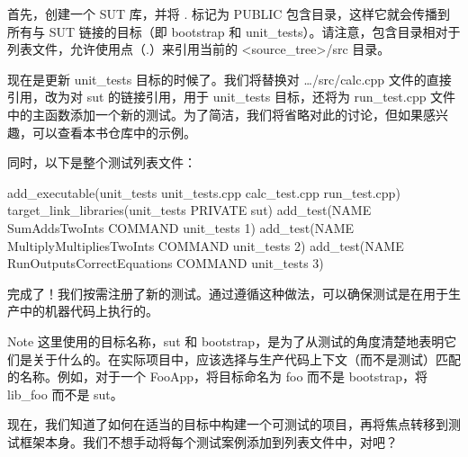 首先，创建一个 SUT 库，并将 . 标记为 PUBLIC 包含目录，这样它就会传播到所有与 SUT 链接的目标（即 bootstrap 和 unit\_tests）。请注意，包含目录相对于列表文件，允许使用点（.）来引用当前的 <source\_tree>/src 目录。

现在是更新 unit\_tests 目标的时候了。我们将替换对 …/src/calc.cpp 文件的直接引用，改为对 sut 的链接引用，用于 unit\_tests 目标，还将为 run\_test.cpp 文件中的主函数添加一个新的测试。为了简洁，我们将省略对此的讨论，但如果感兴趣，可以查看本书仓库中的示例。

同时，以下是整个测试列表文件：


\begin{cmake}
add_executable(unit_tests
               unit_tests.cpp
               calc_test.cpp
               run_test.cpp)
target_link_libraries(unit_tests PRIVATE sut)
add_test(NAME SumAddsTwoInts COMMAND unit_tests 1)
add_test(NAME MultiplyMultipliesTwoInts COMMAND unit_tests 2)
add_test(NAME RunOutputsCorrectEquations COMMAND unit_tests 3)
\end{cmake}

完成了！我们按需注册了新的测试。通过遵循这种做法，可以确保测试是在用于生产中的机器代码上执行的。

\begin{myNotic}{Note}
这里使用的目标名称，sut 和 bootstrap，是为了从测试的角度清楚地表明它们是关于什么的。在实际项目中，应该选择与生产代码上下文（而不是测试）匹配的名称。例如，对于一个 FooApp，将目标命名为 foo 而不是 bootstrap，将 lib\_foo 而不是 sut。
\end{myNotic}

现在，我们知道了如何在适当的目标中构建一个可测试的项目，再将焦点转移到测试框架本身。我们不想手动将每个测试案例添加到列表文件中，对吧？








































